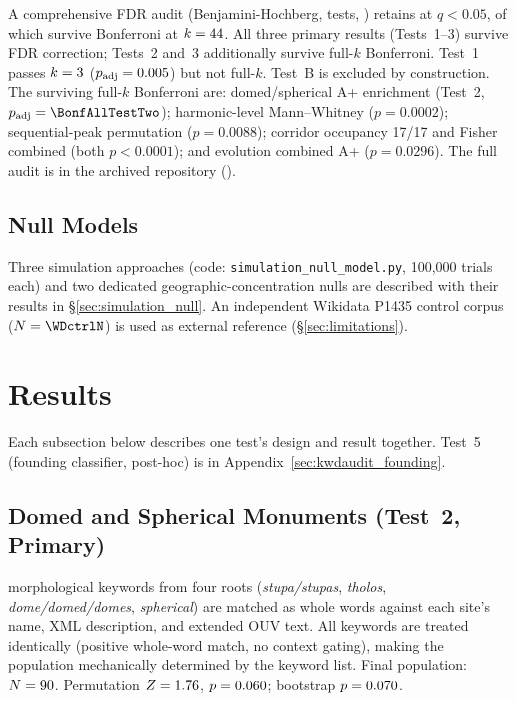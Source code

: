 \documentclass[HARVARD,twocolumn]{USG}
\begin{document}
A comprehensive FDR audit (Benjamini-Hochberg, \NtotalTests{} tests,
\citealt{benjamini1995controlling}) retains \NsurviveFDR{} at $q < 0.05$,
of which \NsurviveBonfAll{} survive Bonferroni at $k = 44$.
All three primary results (Tests~1--3) survive FDR correction; Tests~2
and~3 additionally survive full-$k$ Bonferroni. Test~1 passes $k = 3$ ($p_\mathrm{adj} = 0.005$) but not full-$k$. Test~B is excluded by construction. The \NsurviveBonfAll{} surviving full-$k$ Bonferroni are:
domed/spherical A+ enrichment (Test~2, $p_\mathrm{adj} = \BonfAllTestTwo$);
harmonic-level Mann--Whitney ($p = 0.0002$);
sequential-peak permutation ($p = 0.0088$);
corridor occupancy 17/17 and Fisher combined (both $p < 0.0001$);
and evolution combined A+ ($p = 0.0296$).
The full audit is in the archived repository (\citealt{tenenbaum2026audit}).

\subsection{Null Models}
\label{sec:methods_simulation}

Three simulation approaches (code: \texttt{simulation\_null\_model.py},
100{,}000 trials each) and two dedicated geographic-concentration nulls
are described with their results in \S\ref{sec:simulation_null}.
An independent Wikidata P1435 control corpus ($N = \WDctrlN$) is used
as external reference (\S\ref{sec:limitations}).

\section{Results}
\label{sec:results}

Each subsection below describes one test's design and result together.
Test~5 (founding classifier, post-hoc) is in Appendix~\ref{sec:kwdaudit_founding}.

\subsection{Domed and Spherical Monuments (Test~2, Primary)}
\label{sec:resultscircular}

\NcircKeywords{} morphological keywords from four roots
(\textit{stupa/stupas}, \textit{tholos}, \textit{dome/domed/domes},
\textit{spherical}) are matched as whole words against each site's
name, XML description, and extended OUV text.
All keywords are treated identically (positive whole-word match, no context
gating), making the population mechanically determined by the keyword list.
Final population: $N = 90$.
Permutation $Z = 1.76$,
$p = 0.060$; bootstrap $p = 0.070$.
\end{document}
